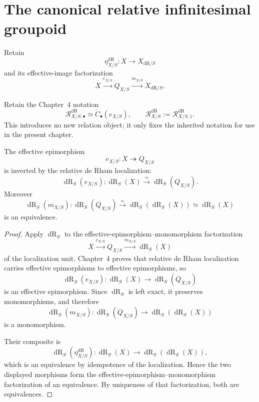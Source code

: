 \section{The canonical relative infinitesimal groupoid}
\label{sec:flg-canonical-relation}

Retain
\[
    \eta_{X/S}^{\mathrm{dR}}:X\to X_{\mathrm{dR}/S}
\]
and its effective-image factorization
\[
    X\xrightarrow{e_{X/S}}Q_{X/S}
      \xrightarrow{m_{X/S}}X_{\mathrm{dR}/S}.
\]

\begin{definition}
\label{def:canonical-relative-infinitesimal-groupoid}
Retain the Chapter~4 notation
\[
    \mathcal R^{\mathrm{dR}}_{X/S,\bullet}
    \simeq
    \check C_\bullet(e_{X/S}),
    \qquad
    \mathcal R^{\mathrm{dR}}_{X/S}:=\mathcal R^{\mathrm{dR}}_{X/S,1}.
\]
This introduces no new relation object; it only fixes the inherited notation
for use in the present chapter.
\end{definition}

\begin{lemma}
\label{lem:effective-quotient-dr-equivalence}
The effective epimorphism
\[
    e_{X/S}:X\twoheadrightarrow Q_{X/S}
\]
is inverted by the relative de Rham localization:
\[
    \operatorname{dR}_S(e_{X/S}):
    \operatorname{dR}_S(X)\xrightarrow{\simeq}\operatorname{dR}_S(Q_{X/S}).
\]
Moreover
\[
    \operatorname{dR}_S(m_{X/S}):
    \operatorname{dR}_S(Q_{X/S})
    \xrightarrow{\simeq}
    \operatorname{dR}_S(\operatorname{dR}_S(X))
    \simeq
    \operatorname{dR}_S(X)
\]
is an equivalence.
\end{lemma}

\begin{proof}
Apply $\operatorname{dR}_S$ to the effective-epimorphism--monomorphism factorization
\[
    X\xrightarrow{e_{X/S}}Q_{X/S}
      \xrightarrow{m_{X/S}}\operatorname{dR}_S(X)
\]
of the localization unit.  Chapter~4 proves
that relative de Rham localization carries effective epimorphisms to
effective epimorphisms, so
\[
    \operatorname{dR}_S(e_{X/S}):
    \operatorname{dR}_S(X)\longrightarrow \operatorname{dR}_S(Q_{X/S})
\]
is an effective epimorphism.  Since $\operatorname{dR}_S$ is left exact, it preserves
monomorphisms, and therefore
\[
    \operatorname{dR}_S(m_{X/S}):
    \operatorname{dR}_S(Q_{X/S})\longrightarrow \operatorname{dR}_S(\operatorname{dR}_S(X))
\]
is a monomorphism.

Their composite is
\[
    \operatorname{dR}_S(\eta_{X/S}^{\mathrm{dR}}):
    \operatorname{dR}_S(X)\longrightarrow \operatorname{dR}_S(\operatorname{dR}_S(X)),
\]
which is an equivalence by idempotence of the localization.  Hence the two
displayed morphisms form the effective-epimorphism--monomorphism
factorization of an equivalence.  By uniqueness of that factorization, both
are equivalences.
\end{proof}


